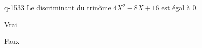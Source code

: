 \begin{truefalse}{q-1533}
Le discriminant du trinôme $4X^2-8X+16$ est égal à $0$.
\item Vrai
\item* Faux
\end{truefalse}

